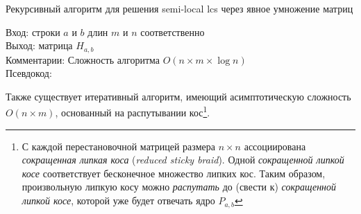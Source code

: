 \begin{algorithm}[h]
\caption{Рекурсивный алгоритм для решения semi-local lcs через явное умножение матриц}\label{alg:monge}
Вход: строки $a$ и $b$ длин $m$ и $n$ соответственно\\
Выход:  матрица $H_{a,b}$\\
Комментарии: Сложность алгоритма $O(n \times m \times \log n)$\\
Псевдокод:

\end{algorithm}


Также существует итеративный алгоритм, имеющий асимптотическую сложность $O(n \times m)$, основанный на распутывании кос\footnote{ С каждой перестановочной матрицей размера $n \times n$ ассоциирована \emph{сокращенная липкая коса} (\emph{reduced sticky braid}). Одной \emph{сокращенной липкой косе} соответствует бесконечное множество липких кос. Таким образом, произвольную липкую косу можно  \emph{распутать} до  (свести к) \emph{сокращенной липкой косе}, которой уже будет отвечать ядро $P_{a,b}$
}.




